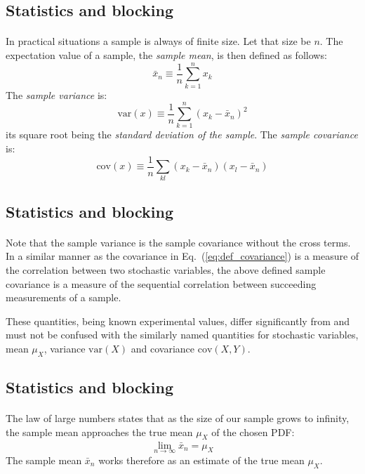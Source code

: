 \documentclass[%
twoside,                 %
final,                   %
10pt]{article}
\begin{document}
\subsection*{Statistics and blocking}

\paragraph{}
In practical situations a sample is always of finite size. Let that
size be $n$. The expectation value of a sample, the \emph{sample mean}, is then defined as follows:
\[
\bar{x}_n \equiv \frac{1}{n}\sum_{k=1}^n x_k
\]
The \emph{sample variance} is:
\[
\mathrm{var}(x) \equiv \frac{1}{n}\sum_{k=1}^n (x_k - \bar{x}_n)^2
\]
its square root being the \emph{standard deviation of the sample}. The
\emph{sample covariance} is:
\[
\mathrm{cov}(x)\equiv\frac{1}{n}\sum_{kl}(x_k - \bar{x}_n)(x_l - \bar{x}_n)
\]



\subsection*{Statistics and blocking}

\paragraph{}
Note that the sample variance is the sample covariance without the
cross terms. In a similar manner as the covariance in Eq.~(\ref{eq:def_covariance}) is a measure of the correlation between
two stochastic variables, the above defined sample covariance is a
measure of the sequential correlation between succeeding measurements
of a sample.

These quantities, being known experimental values, differ
significantly from and must not be confused with the similarly named
quantities for stochastic variables, mean $\mu_X$, variance $\mathrm{var}(X)$
and covariance $\mathrm{cov}(X,Y)$.



\subsection*{Statistics and blocking}

\paragraph{}
The law of large numbers
states that as the size of our sample grows to infinity, the sample
mean approaches the true mean $\mu_X^{\phantom X}$ of the chosen PDF:
\[
\lim_{n\to\infty}\bar{x}_n = \mu_X^{\phantom X}
\]
The sample mean $\bar{x}_n$ works therefore as an estimate of the true
mean $\mu_X^{\phantom X}$.
\end{document}
